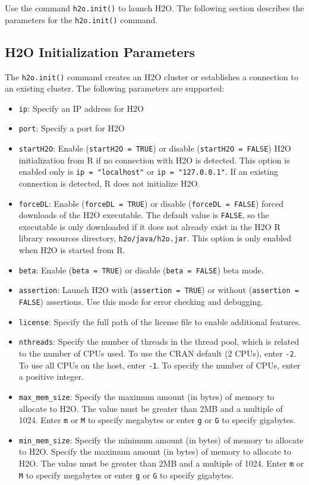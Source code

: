 \documentclass{article}[11pt]
\begin{document}
Use the command {\texttt{h2o.init()}} to launch H2O. The following section describes the parameters for the {\texttt{h2o.init()}} command. 

\subsection{H2O Initialization Parameters}

The {\texttt{h2o.init()}} command creates an H2O cluster or establishes a connection to an existing cluster. The following parameters are supported: 

\begin{itemize}
\item {\texttt{ip}}: Specify an IP address for H2O
\item {\texttt{port}}: Specify a port for H2O
\item {\texttt{startH2O}}: Enable ({\texttt{startH2O = TRUE}}) or disable ({\texttt{startH2O = FALSE}}) H2O initialization from R if no connection with H2O is detected. This option is enabled only is {\texttt{ip = "localhost"}} or {\texttt{ip = "127.0.0.1"}}. If an existing connection is detected, R does not initialize H2O. 
\item {\texttt{forceDL}}: Enable ({\texttt{forceDL = TRUE}}) or disable ({\texttt{forceDL = FALSE}}) forced downloads of the H2O executable. The default value is {\texttt{FALSE}}, so the executable is  only downloaded if it does not already exist in the H2O R library resources directory, {\texttt{h2o/java/h2o.jar}}. This option is only enabled when H2O is started from R. 
\item {\texttt{beta}}:  Enable ({\texttt{beta = TRUE}}) or disable ({\texttt{beta = FALSE}}) beta mode. 
\item {\texttt{assertion}}: Launch H2O with ({\texttt{assertion = TRUE}}) or without ({\texttt{assertion = FALSE}}) assertions. Use this mode for error checking and debugging. 
\item {\texttt{license}}: Specify the full path of the license file to enable additional features. 
\item {\texttt{nthreads}}: Specify the number of threads in the thread pool, which is related to the number of CPUs used. To use the CRAN default (2 CPUs), enter {\texttt{-2}}. To use all CPUs on the host, enter {\texttt{-1}}. To specify the number of CPUs, enter a positive integer. 
\item {\texttt{max\_mem\_size}}: Specify the maximum amount (in bytes) of memory to allocate to H2O. The value must be greater than 2MB and a multiple of 1024. Enter {\texttt{m}} or {\texttt{M}} to specify megabytes or enter {\texttt{g}} or {\texttt{G}} to specify gigabytes. 
\item {\texttt{min\_mem\_size}}: Specify the minimum amount (in bytes) of memory to allocate to H2O. Specify the maximum amount (in bytes) of memory to allocate to H2O. The value must be greater than 2MB and a multiple of 1024. Enter {\texttt{m}} or {\texttt{M}} to specify megabytes or enter {\texttt{g}} or {\texttt{G}} to specify gigabytes.
\end{itemize}
\end{document}

